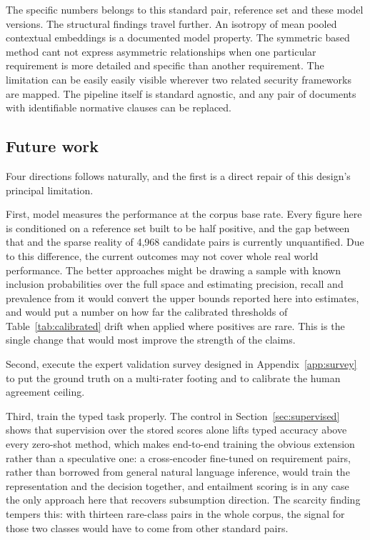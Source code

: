 The specific numbers belongs to this standard pair, reference set and these
model versions. The structural findings travel further. An isotropy of mean pooled
contextual embeddings is a documented model property. The symmetric based method cant not express asymmetric relationships when one particular requirement is more detailed and specific than another requirement. The limitation can be easily easily visible wherever two related security
frameworks are mapped. The pipeline itself is standard agnostic, and any pair of
documents with identifiable normative clauses can be replaced.

\subsection*{Future work}\label{sec:futurework}

Four directions follows naturally, and the first is a direct repair of this design's principal limitation.

First, model measures the performance at the corpus base rate. Every figure here is
conditioned on a reference set built to be half positive, and the gap between
that and the sparse reality of 4{,}968 candidate pairs is currently unquantified. Due to this difference, the current outcomes may not cover whole real world performance. The better approaches might be
drawing a sample with known inclusion probabilities over the full space and
estimating precision, recall and prevalence from it would convert the upper
bounds reported here into estimates, and would put a number on how far the
calibrated thresholds of Table~\ref{tab:calibrated} drift when applied where
positives are rare. This is the single change that would most improve the
strength of the claims.

Second, execute the expert validation survey designed in
Appendix~\ref{app:survey} to put the ground truth on a multi-rater footing and to
calibrate the human agreement ceiling.

Third, train the typed task properly. The control in
Section~\ref{sec:supervised} shows that supervision over the stored scores alone
lifts typed accuracy above every zero-shot method, which makes end-to-end training
the obvious extension rather than a speculative one: a cross-encoder fine-tuned on
requirement pairs, rather than borrowed from general natural language inference,
would train the representation and the decision together, and entailment scoring
is in any case the only approach here that recovers subsumption direction. The
scarcity finding tempers this: with thirteen rare-class pairs in the whole corpus,
the signal for those two classes would have to come from other standard pairs.

